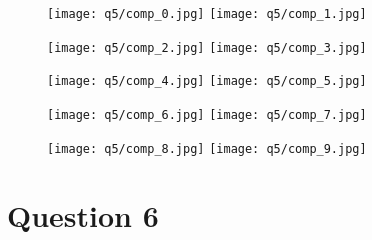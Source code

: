 \documentclass[11pt, fleqn]{article}
\begin{document}
\begin{figure}[H]
    \begin{floatrow}
        \ffigbox[0.47\textwidth]{}
        {\texttt{[image: q5/comp\_0.jpg]}}
        \ffigbox[0.47\textwidth]{}
        {\texttt{[image: q5/comp\_1.jpg]}}
    \end{floatrow}
\end{figure}
\begin{figure}[H]
    \begin{floatrow}
        \ffigbox[0.47\textwidth]{}
        {\texttt{[image: q5/comp\_2.jpg]}}
        \ffigbox[0.47\textwidth]{}
        {\texttt{[image: q5/comp\_3.jpg]}}
    \end{floatrow}
\end{figure}
\begin{figure}[H]
    \begin{floatrow}
        \ffigbox[0.47\textwidth]{}
        {\texttt{[image: q5/comp\_4.jpg]}}
        \ffigbox[0.47\textwidth]{}
        {\texttt{[image: q5/comp\_5.jpg]}}
    \end{floatrow}
\end{figure}
\begin{figure}[H]
    \begin{floatrow}
        \ffigbox[0.47\textwidth]{}
        {\texttt{[image: q5/comp\_6.jpg]}}
        \ffigbox[0.47\textwidth]{}
        {\texttt{[image: q5/comp\_7.jpg]}}
    \end{floatrow}
\end{figure}
\begin{figure}[H]
    \begin{floatrow}
        \ffigbox[0.47\textwidth]{}
        {\texttt{[image: q5/comp\_8.jpg]}}
        \ffigbox[0.47\textwidth]{}
        {\texttt{[image: q5/comp\_9.jpg]}}
    \end{floatrow}
\end{figure}

\newpage
\section*{Question 6}
\setcounter{equation}{0}
\setcounter{figure}{0}
\end{document}
